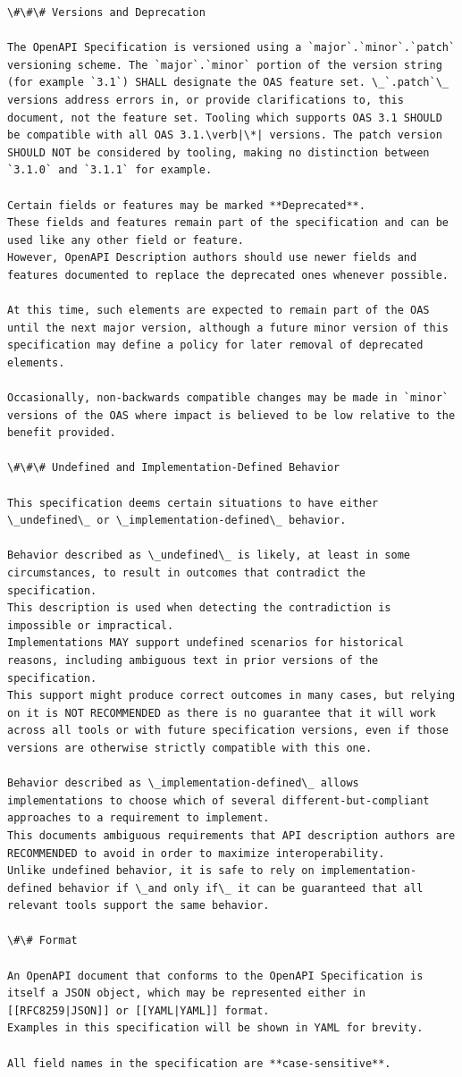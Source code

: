 \begin{verbatim}
\#\#\# Versions and Deprecation

The OpenAPI Specification is versioned using a `major`.`minor`.`patch` versioning scheme. The `major`.`minor` portion of the version string (for example `3.1`) SHALL designate the OAS feature set. \_`.patch`\_ versions address errors in, or provide clarifications to, this document, not the feature set. Tooling which supports OAS 3.1 SHOULD be compatible with all OAS 3.1.\verb|\*| versions. The patch version SHOULD NOT be considered by tooling, making no distinction between `3.1.0` and `3.1.1` for example.

Certain fields or features may be marked **Deprecated**.
These fields and features remain part of the specification and can be used like any other field or feature.
However, OpenAPI Description authors should use newer fields and features documented to replace the deprecated ones whenever possible.

At this time, such elements are expected to remain part of the OAS until the next major version, although a future minor version of this specification may define a policy for later removal of deprecated elements.

Occasionally, non-backwards compatible changes may be made in `minor` versions of the OAS where impact is believed to be low relative to the benefit provided.

\#\#\# Undefined and Implementation-Defined Behavior

This specification deems certain situations to have either \_undefined\_ or \_implementation-defined\_ behavior.

Behavior described as \_undefined\_ is likely, at least in some circumstances, to result in outcomes that contradict the specification.
This description is used when detecting the contradiction is impossible or impractical.
Implementations MAY support undefined scenarios for historical reasons, including ambiguous text in prior versions of the specification.
This support might produce correct outcomes in many cases, but relying on it is NOT RECOMMENDED as there is no guarantee that it will work across all tools or with future specification versions, even if those versions are otherwise strictly compatible with this one.

Behavior described as \_implementation-defined\_ allows implementations to choose which of several different-but-compliant approaches to a requirement to implement.
This documents ambiguous requirements that API description authors are RECOMMENDED to avoid in order to maximize interoperability.
Unlike undefined behavior, it is safe to rely on implementation-defined behavior if \_and only if\_ it can be guaranteed that all relevant tools support the same behavior.

\#\# Format

An OpenAPI document that conforms to the OpenAPI Specification is itself a JSON object, which may be represented either in [[RFC8259|JSON]] or [[YAML|YAML]] format.
Examples in this specification will be shown in YAML for brevity.

All field names in the specification are **case-sensitive**.
\end{verbatim}


